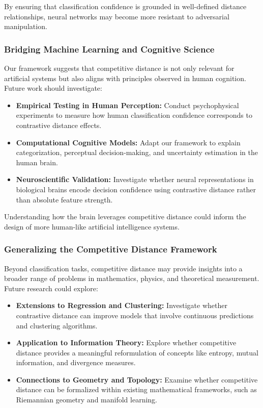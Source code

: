 By ensuring that classification confidence is grounded in well-defined distance relationships, neural networks may become more resistant to adversarial manipulation.

\subsubsection{Bridging Machine Learning and Cognitive Science}

Our framework suggests that competitive distance is not only relevant for artificial systems but also aligns with principles observed in human cognition. Future work should investigate:

\begin{itemize}
    \item \textbf{Empirical Testing in Human Perception:} Conduct psychophysical experiments to measure how human classification confidence corresponds to contrastive distance effects.
    \item \textbf{Computational Cognitive Models:} Adapt our framework to explain categorization, perceptual decision-making, and uncertainty estimation in the human brain.
    \item \textbf{Neuroscientific Validation:} Investigate whether neural representations in biological brains encode decision confidence using contrastive distance rather than absolute feature strength.
\end{itemize}

Understanding how the brain leverages competitive distance could inform the design of more human-like artificial intelligence systems.

\subsubsection{Generalizing the Competitive Distance Framework}

Beyond classification tasks, competitive distance may provide insights into a broader range of problems in mathematics, physics, and theoretical measurement. Future research could explore:

\begin{itemize}
    \item \textbf{Extensions to Regression and Clustering:} Investigate whether contrastive distance can improve models that involve continuous predictions and clustering algorithms.
    \item \textbf{Application to Information Theory:} Explore whether competitive distance provides a meaningful reformulation of concepts like entropy, mutual information, and divergence measures.
    \item \textbf{Connections to Geometry and Topology:} Examine whether competitive distance can be formalized within existing mathematical frameworks, such as Riemannian geometry and manifold learning.
\end{itemize}

